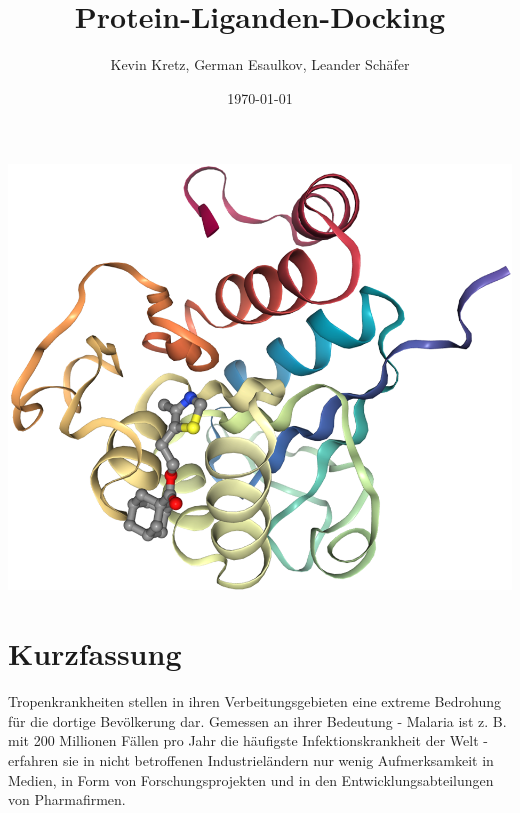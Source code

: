 \documentclass[11pt]{article}
\title{Protein-Liganden-Docking}
\author{Kevin Kretz, German Esaulkov, Leander Schäfer}
\date{\today}
\begin{document}


    \maketitle

    \includegraphics[width=\linewidth]{protein-ligand}

    \pagebreak

    \tableofcontents


    \section{Kurzfassung}\label{sec:kurzfassung}



    Tropenkrankheiten stellen in ihren Verbeitungsgebieten eine extreme Bedrohung für die dortige Bevölkerung dar.
    Gemessen an ihrer Bedeutung - Malaria ist z.
    B. mit 200 Millionen Fällen pro Jahr die häufigste Infektionskrankheit der Welt  - erfahren sie in nicht betroffenen Industrieländern nur wenig Aufmerksamkeit in Medien, in Form von Forschungsprojekten und in den Entwicklungsabteilungen von Pharmafirmen.
\end{document}
